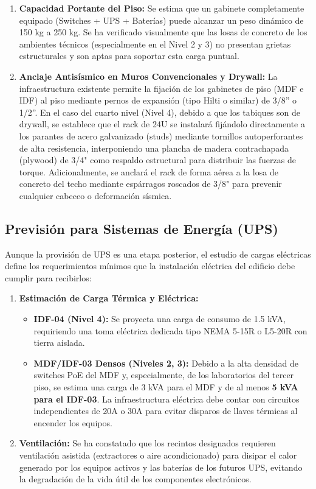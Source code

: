 \begin{enumerate}
    \item \textbf{Capacidad Portante del Piso:} Se estima que un gabinete completamente equipado (Switches + UPS + Baterías) puede alcanzar un peso dinámico de 150 kg a 250 kg. Se ha verificado visualmente que las losas de concreto de los ambientes técnicos (especialmente en el Nivel 2 y 3) no presentan grietas estructurales y son aptas para soportar esta carga puntual.
    \item \textbf{Anclaje Antisísmico en Muros Convencionales y Drywall:} La infraestructura existente permite la fijación de los gabinetes de piso (MDF e IDF) al piso mediante pernos de expansión (tipo Hilti o similar) de 3/8'' o 1/2''. En el caso del cuarto nivel (Nivel 4), debido a que los tabiques son de drywall, se establece que el rack de 24U se instalará fijándolo directamente a los parantes de acero galvanizado (studs) mediante tornillos autoperforantes de alta resistencia, interponiendo una plancha de madera contrachapada (plywood) de 3/4" como respaldo estructural para distribuir las fuerzas de torque. Adicionalmente, se anclará el rack de forma aérea a la losa de concreto del techo mediante espárragos roscados de 3/8" para prevenir cualquier cabeceo o deformación sísmica.
\end{enumerate}

\subsection*{Previsión para Sistemas de Energía (UPS)}

Aunque la provisión de UPS es una etapa posterior, el estudio de cargas eléctricas define los requerimientos mínimos que la instalación eléctrica del edificio debe cumplir para recibirlos:

\begin{enumerate}
    \item \textbf{Estimación de Carga Térmica y Eléctrica:}
    \begin{itemize}
        \item \textbf{IDF-04 (Nivel 4):} Se proyecta una carga de consumo de 1.5 kVA, requiriendo una toma eléctrica dedicada tipo NEMA 5-15R o L5-20R con tierra aislada.
        \item \textbf{MDF/IDF-03 Densos (Niveles 2, 3):} Debido a la alta densidad de switches PoE del MDF y, especialmente, de los laboratorios del tercer piso, se estima una carga de 3 kVA para el MDF y de al menos \textbf{5 kVA para el IDF-03}. La infraestructura eléctrica debe contar con circuitos independientes de 20A o 30A para evitar disparos de llaves térmicas al encender los equipos.
    \end{itemize}
    \item \textbf{Ventilación:} Se ha constatado que los recintos designados requieren ventilación asistida (extractores o aire acondicionado) para disipar el calor generado por los equipos activos y las baterías de los futuros UPS, evitando la degradación de la vida útil de los componentes electrónicos.
\end{enumerate}
